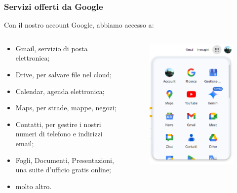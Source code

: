 \documentclass[handout]{beamer}
\begin{document}
\begin{frame}
\frametitle{Servizi offerti da Google}
Con il nostro account Google, abbiamo accesso a:
\begin{columns}
  \begin{column}{.6\textwidth}
\begin{itemize}
  \item \alert{Gmail}, servizio di posta elettronica;\pause
  \item \alert{Drive}, per salvare file nel cloud;\pause
  \item \alert{Calendar}, agenda elettronica;\pause
  \item \alert{Maps}, per strade, mappe, negozi;\pause
  \item \alert{Contatti}, per gestire i nostri numeri di telefono e indirizzi email;\pause
  \item \alert{Fogli, Documenti, Presentazioni}, una suite d'ufficio gratis online;
  \item molto altro.
\end{itemize}
  \end{column}
  \begin{column}{.3\textwidth}
    \begin{figure}
      \includegraphics[width=\columnwidth]{img/googleserv.png}
    \end{figure}
  \end{column}
  \end{columns}
\end{frame}
\end{document}
